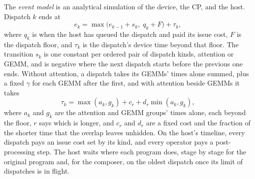 The \emph{event model} is an analytical simulation of the device, the CP, and the host.
Dispatch $k$ ends at
\begin{equation}
\label{eq:cmd}
e_k = \max\bigl(e_{k-1} + s_k,\; q_k + F\bigr) + \tau_k,
\end{equation}
where $q_k$ is when the host has queued the dispatch and paid its issue cost, $F$ is the dispatch floor, and $\tau_k$ is the dispatch's device time beyond that floor.
The transition $s_k$ is one constant per ordered pair of dispatch kinds, attention or GEMM, and is negative where the next dispatch starts before the previous one ends.
Without attention, a dispatch takes its GEMMs' times alone summed, plus a fixed $\gamma$ for each GEMM after the first, and with attention beside GEMMs it takes
\begin{equation}
\label{eq:overlap}
\tau_k = \max(a_k, g_k) + c_r + d_r \min(a_k, g_k),
\end{equation}
where $a_k$ and $g_k$ are the attention and GEMM groups' times alone, each beyond the floor, $r$ says which is longer, and $c_r$ and $d_r$ are a fixed cost and the fraction of the shorter time that the overlap leaves unhidden.
On the host's timeline, every dispatch pays an issue cost set by its kind, and every operator pays a post-processing step.
The host waits where each program does, stage by stage for the original program and, for the composer, on the oldest dispatch once its limit of dispatches is in flight.

